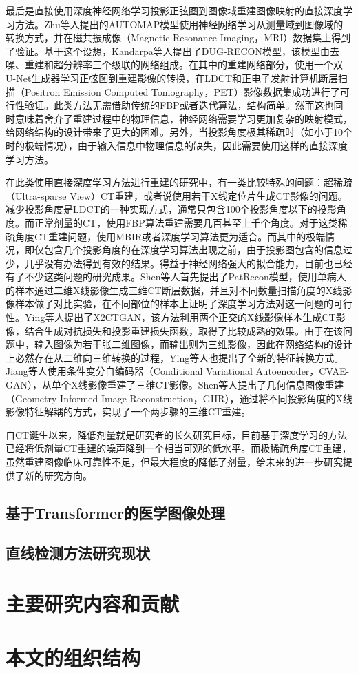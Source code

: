 最后是直接使用深度神经网络学习投影正弦图到图像域重建图像映射的直接深度学习方法。Zhu等人提出的AUTOMAP模型使用神经网络学习从测量域到图像域的转换方式，并在磁共振成像（Magnetic Resonance Imaging，MRI）数据集上得到了验证\cite{zhuImageReconstructionDomaintransform2018}。基于这个设想，Kandarpa等人提出了DUG-RECON模型，该模型由去噪、重建和超分辨率三个级联的网络组成。在其中的重建网络部分，使用一个双U-Net生成器学习正弦图到重建影像的转换，在LDCT和正电子发射计算机断层扫描（Positron Emission Computed Tomography，PET）影像数据集成功进行了可行性验证\cite{kandarpaDUGRECONFrameworkDirect2021}。此类方法无需借助传统的FBP或者迭代算法，结构简单。然而这也同时意味着舍弃了重建过程中的物理信息，神经网络需要学习更加复杂的映射模式，给网络结构的设计带来了更大的困难。另外，当投影角度极其稀疏时（如小于10个时的极端情况），由于输入信息中物理信息的缺失，因此需要使用这样的直接深度学习方法。

在此类使用直接深度学习方法进行重建的研究中，有一类比较特殊的问题：超稀疏（Ultra-sparse View）CT重建，或者说使用若干X线定位片生成CT影像的问题。减少投影角度是LDCT的一种实现方式，通常只包含100个投影角度以下的投影角度。而正常剂量的CT，使用FBP算法重建需要几百甚至上千个角度。对于这类稀疏角度CT重建问题，使用MBIR或者深度学习算法更为适合。而其中的极端情况，即仅包含几个投影角度的在深度学习算法出现之前，由于投影图包含的信息过少，几乎没有办法得到有效的结果。得益于神经网络强大的拟合能力，目前也已经有了不少这类问题的研究成果。Shen等人首先提出了PatRecon模型，使用单病人的样本通过二维X线影像生成三维CT断层数据，并且对不同数量扫描角度的X线影像样本做了对比实验，在不同部位的样本上证明了深度学习方法对这一问题的可行性\cite{shenPatientspecificReconstructionVolumetric2019}。Ying等人提出了X2CTGAN，该方法利用两个正交的X线影像样本生成CT影像，结合生成对抗损失和投影重建损失函数，取得了比较成熟的效果\cite{yingX2CTGANReconstructingCT2019}。由于在该问题中，输入图像为若干张二维图像，而输出则为三维影像，因此在网络结构的设计上必然存在从二维向三维转换的过程，Ying等人也提出了全新的特征转换方式。Jiang等人使用条件变分自编码器（Conditional Variational Autoencoder，CVAE-GAN），从单个X线影像重建了三维CT影像\cite{jiangReconstruction3DCT2021}。Shen等人提出了几何信息图像重建（Geometry-Informed Image Reconstruction，GIIR），通过将不同投影角度的X线影像特征解耦的方式，实现了一个两步骤的三维CT重建\cite{shenGeometryinformedDeepLearning2022}。

自CT诞生以来，降低剂量就是研究者的长久研究目标，目前基于深度学习的方法已经将低剂量CT重建的噪声降到一个相当可观的低水平。而极稀疏角度CT重建，虽然重建图像临床可靠性不足，但最大程度的降低了剂量，给未来的进一步研究提供了新的研究方向。


\subsection{基于Transformer的医学图像处理}

\subsection{直线检测方法研究现状}

\section{主要研究内容和贡献}

\section{本文的组织结构}

